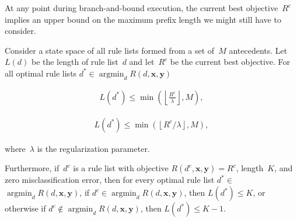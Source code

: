 \documentclass[twoside,11pt]{article}
\newcommand{\x}{\mathbf{x}}
\newcommand{\y}{\mathbf{y}}
\def\RL{{d}}
\def\Obj{R}
\def\Reg{{\lambda}}
\def\CurrentObj{{R^c}}
\def\CurrentRL{d^c}
\def\OptimalRL{d^*}
\DeclareMathOperator*{\argmin}{argmin}
\begin{document}
At any point during branch-and-bound execution, the current best objective~$\CurrentObj$
implies an upper bound on the maximum prefix length we might still have to consider.
%
\begin{theorem}
\label{thm:ub-prefix-length}
Consider a state space of all rule lists formed from a set of~$M$ antecedents.
%
Let~$L(\RL)$ be the length of rule list~$\RL$
and let~$\CurrentObj$ be the current best objective.
%
For all optimal rule lists ${\OptimalRL \in \argmin_\RL \Obj(\RL, \x, \y)}$
\begin{arxiv}
\begin{align}
L(\OptimalRL) \le \min \left(\left\lfloor \frac{\CurrentObj}{\Reg} \right\rfloor, M \right),
\label{eq:max-length}
\end{align}
\end{arxiv}
\begin{kdd}
\begin{align}
L(\OptimalRL) \le \min \left(\left\lfloor \CurrentObj / \Reg \right\rfloor, M \right),
\label{eq:max-length}
\end{align}
\end{kdd}
where~$\Reg$ is the regularization parameter.
%
\begin{arxiv}
Furthermore, if~$\CurrentRL$ is a rule list with
objective ${\Obj(\CurrentRL, \x, \y) = \CurrentObj}$,
length~$K$, and zero misclassification error,
then for every optimal rule list
${\OptimalRL \in}$ ${\argmin_\RL \Obj(\RL, \x, \y)}$,
if ${\CurrentRL \in \argmin_d \Obj(\RL, \x, \y)}$,
then ${L(\OptimalRL) \le K}$,
or otherwise if ${\CurrentRL \notin \argmin_d \Obj(\RL, \x, \y)}$,
then ${L(\OptimalRL) \le K - 1}$.
\end{arxiv}
\end{theorem}
\end{document}
